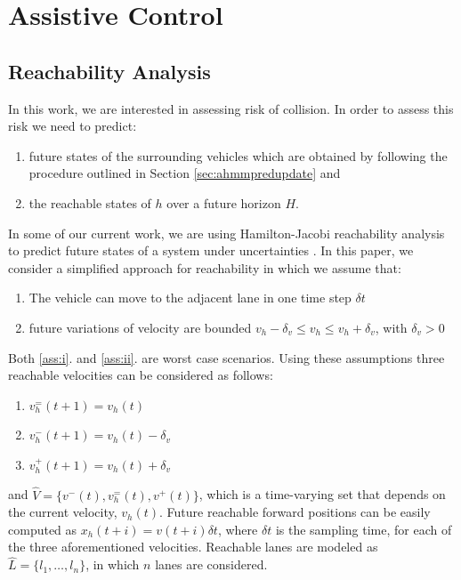\documentclass[letterpaper, 10 pt, conference]{ieeeconf}  %
\newcommand\NB[1]{$\spadesuit$\footnote{NB: #1}}
\begin{document}
\section{Assistive Control} \label{sec:adapt}


\subsection{Reachability Analysis}

In this work, we are interested in assessing risk of collision. In order to assess this risk we need to predict:
\begin{enumerate}
\item future states of the surrounding vehicles which are obtained by following the procedure outlined in Section \ref{sec:ahmmpredupdate} and
\item the reachable states of $h$ over a future horizon $H$.
\end{enumerate}
In some of our current work, we are using Hamilton-Jacobi reachability analysis to predict future states of a system under uncertainties \cite{esen}. In this paper, we consider a simplified approach for reachability in which we assume that:
\begin{enumerate}
\item The vehicle can move to the adjacent lane in one time step $\delta t$ \label{ass:i}
\item future variations of velocity are bounded $v_h-\delta_v \leq v_h\leq v_h+\delta_v$, with $\delta_v>0$ \label{ass:ii}
\end{enumerate}
Both \ref{ass:i}. and \ref{ass:ii}. are worst case scenarios. %
Using these assumptions three reachable velocities can be considered as follows:
\begin{enumerate} %
    \item $v_h^=(t+1)=v_h(t)$
    \item $v_h^-(t+1)=v_h(t)-\delta_v$
    \item $v_h^+(t+1)=v_h(t)+\delta_v$
\end{enumerate} 
and $\hat{V} = \{v^-(t),v_h^=(t),v^+(t)\}$, which is a time-varying set that depends on the current velocity, $v_h(t)$. Future reachable forward positions can be easily computed as $x_h(t+i)=v(t+i)\delta t$, where $\delta t$ is the sampling time, for each of the three aforementioned velocities. Reachable lanes are modeled as $\hat{L} = \{l_1,\ldots,l_n\}$, in which $n$ lanes are considered. 
\end{document}

